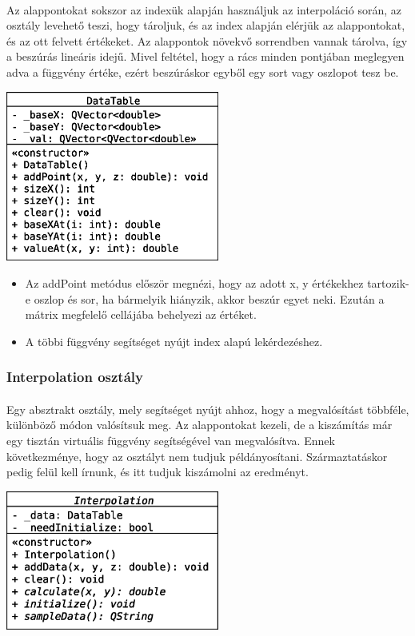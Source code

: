 \documentclass[12pt]{report}
\begin{document}
\paragraph{}
Az alappontokat sokszor az indexük alapján használjuk az interpoláció során, az osztály levehető teszi, hogy tároljuk, és az index alapján elérjük az alappontokat, és az ott felvett értékeket. Az alappontok növekvő sorrendben vannak tárolva, így a beszúrás lineáris idejű. Mivel feltétel, hogy a rács minden pontjában meglegyen adva a függvény értéke, ezért beszúráskor egyből egy sort vagy oszlopot tesz be.
\begin{center}
\includegraphics[width=7cm]{pics/uml/DataTable}
\end{center}
\begin{itemize}
\item Az addPoint metódus először megnézi, hogy az adott x, y értékekhez tartozik-e oszlop és sor, ha bármelyik hiányzik, akkor beszúr egyet neki. Ezután a mátrix megfelelő cellájába behelyezi az értéket.
\item A többi függvény segítséget nyújt index alapú lekérdezéshez.
\end{itemize}

\subsubsection{Interpolation osztály}
\paragraph{}
Egy absztrakt osztály, mely segítséget nyújt ahhoz, hogy a megvalósítást többféle, különböző módon valósítsuk meg. Az alappontokat kezeli, de a kiszámítás már egy tisztán virtuális függvény segítségével van megvalósítva. Ennek következménye, hogy az osztályt nem tudjuk példányosítani. Származtatáskor pedig felül kell írnunk, és itt tudjuk kiszámolni az eredményt.
\begin{center}
\includegraphics[width=7cm]{pics/uml/Interpolation}
\end{center}
\end{document}
